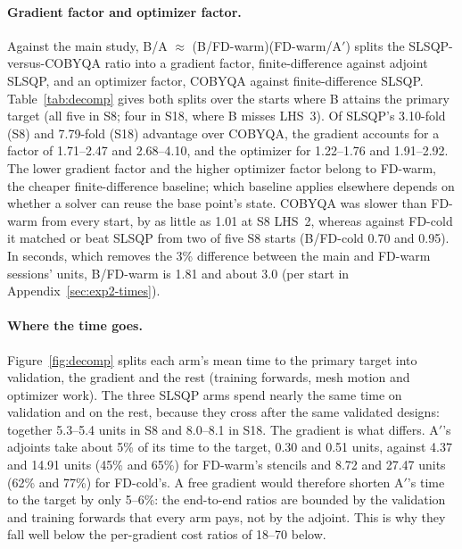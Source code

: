\paragraph{Gradient factor and optimizer factor.}
Against the main study, B/A $\approx$ (B/FD-warm)(FD-warm/A$'$) splits the
SLSQP-versus-COBYQA ratio into a gradient factor, finite-difference against
adjoint SLSQP, and an optimizer factor, COBYQA against finite-difference
SLSQP. Table~\ref{tab:decomp} gives both splits over the starts where B
attains the primary target (all five in S8; four in S18, where B misses
LHS~3). Of SLSQP's 3.10-fold (S8) and 7.79-fold (S18) advantage over
COBYQA, the gradient accounts for a factor of 1.71--2.47 and 2.68--4.10, and
the optimizer for 1.22--1.76 and 1.91--2.92. The lower gradient factor and
the higher optimizer factor belong to FD-warm, the cheaper finite-difference
baseline; which baseline applies elsewhere depends on whether a solver can
reuse the base point's state. COBYQA was slower than FD-warm from every
start, by as little as 1.01 at S8 LHS~2, whereas against FD-cold it matched
or beat SLSQP from two of five S8 starts (B/FD-cold 0.70 and 0.95). In
seconds, which removes the 3\% difference between the main and FD-warm
sessions' units, B/FD-warm is 1.81 and about 3.0 (per start in
Appendix~\ref{sec:exp2-times}).

\begin{table}[htbp]\centering\small
\caption{The gradient factor and the optimizer factor at the primary
targets: geometric means over the starts where B attains the target (five
in S8, four in S18), each ratio formed within one session's units. The
products close the main study's B/A only approximately, because their
factors come from different sessions.}
\label{tab:decomp}

\end{table}

\paragraph{Where the time goes.}
Figure~\ref{fig:decomp} splits each arm's mean time to the primary target
into validation, the gradient and the rest (training forwards, mesh motion
and optimizer work). The three SLSQP arms spend nearly the same time on
validation and on the rest, because they cross after the same validated
designs: together 5.3--5.4 units in S8 and 8.0--8.1 in S18. The gradient is what
differs. A$'$'s adjoints take about 5\% of its time to the target, 0.30 and
0.51 units, against 4.37 and 14.91 units (45\% and 65\%) for FD-warm's
stencils and 8.72 and 27.47 units (62\% and 77\%) for FD-cold's. A free
gradient would therefore shorten A$'$'s time to the target by only 5--6\%:
the end-to-end ratios are bounded by the validation and training forwards
that every arm pays, not by the adjoint. This is why they fall well below
the per-gradient cost ratios of 18--70 below.

